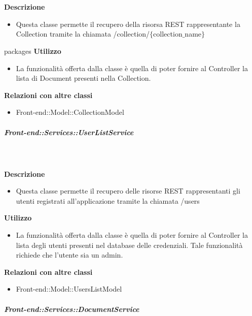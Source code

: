         \textbf{\\ \\ Descrizione} 
          \begin{itemize}
            \item[] Questa classe permette il recupero della risorsa REST rappresentante la Collection tramite la chiamata  /collection/$\{$collection$\_$name$\}$
          \end{itemize}      packages
        \textbf{Utilizzo}  
          \begin{itemize}
            \item[] La  funzionalità offerta dalla classe è quella di poter fornire al Controller la lista di Document presenti nella Collection.
          \end{itemize}
          \textbf{Relazioni con altre classi}
          \begin{itemize}
              \item{Front-end::Model::CollectionModel}
          \end{itemize}
      \subparagraph{Front-end::Services::UserListService}
        
        \textbf{\\ \\ Descrizione} 
          \begin{itemize}
            \item[] Questa classe permette il recupero delle risorse REST rappresentanti gli utenti registrati all'applicazione tramite la chiamata /users
          \end{itemize}      
        \textbf{Utilizzo}  
          \begin{itemize}
            \item[] La funzionalità offerta dalla classe è quella di poter fornire al Controller la lista degli utenti presenti nel database delle credenziali.
Tale funzionalità richiede che l'utente sia un admin.
          \end{itemize}
          \textbf{Relazioni con altre classi}
          \begin{itemize}
              \item{Front-end::Model::UsersListModel}
          \end{itemize}
      \subparagraph{Front-end::Services::DocumentService}
        
